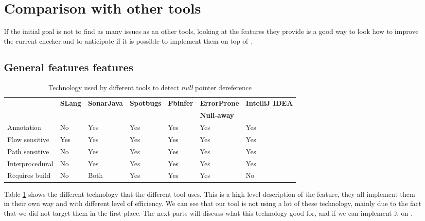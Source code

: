 \section{Comparison with other tools}
\label{sec:comparison}

If the initial goal is not to find as many issues as an other tools, looking at the features they provide is a good way to look how to improve the current checker and to anticipate if it is possible to implement them on top of \slang{}.


\subsection{General features features}
\label{subsec:general_features}

\begin{table}[h]
	\centering
	\caption{Technology used by different tools to detect \emph{null} pointer dereference}
	\label{table:tools_features}
	\begin{tabular}{|l|llllll|}
		\hline
		& \bf SLang & \bf SonarJava & \bf Spotbugs & \bf Fbinfer  & \bf ErrorProne & \bf IntelliJ IDEA \\ 
		&&&&& \bf Null-away & \\ \hline
		Annotation & No    & Yes       & Yes              & Yes      & Yes                   & Yes           \\
		Flow sensitive       & Yes   & Yes       & Yes              & Yes      & Yes                   & Yes           \\
		Path sensitive       & No    & Yes       & Yes              & Yes      & Yes                   & Yes           \\
		Interprocedural      & No    & Yes       & Yes   & Yes      & Yes                   & Yes           \\
		Requires build       & No    & Both      & Yes              & Yes      & Yes                   & No    \\   
		\hline    
	\end{tabular}
\end{table}

Table \ref{table:tools_features} shows the different technology that the different tool uses. 
This is a high level description of the feature, they all implement them in their own way and with different level of efficiency. 
We can see that our tool is not using a lot of these technology, mainly due to the fact that we did not target them in the first place. 
The next parts will discuss what this technology good for, and if we can implement it on \slang{}.

